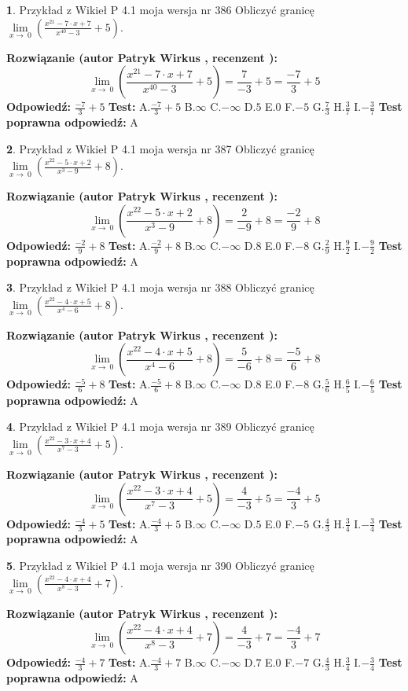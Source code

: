 \documentclass[12pt, a4paper]{article}
\theoremstyle{definition} %
\newtheorem{zad}{}
\newcommand{\zadStart}[1]{\begin{zad}#1\newline}
\newcommand{\zadStop}{\end{zad}}
\newcommand{\rozwStart}[2]{\noindent \textbf{Rozwiązanie (autor #1 , recenzent #2): }\newline}
\newcommand{\rozwStop}{\newline}
\newcommand{\odpStart}{\noindent \textbf{Odpowiedź:}\newline}
\newcommand{\odpStop}{\newline}
\newcommand{\testStart}{\noindent \textbf{Test:}\newline}
\newcommand{\testStop}{\newline}
\newcommand{\kluczStart}{\noindent \textbf{Test poprawna odpowiedź:}\newline}
\newcommand{\kluczStop}{\newline}
\begin{document}
\zadStart{Przykład z Wikieł P 4.1 moja wersja nr 386}
Obliczyć granicę $\lim\limits_{x\to\ 0}(\frac{x^{21}-7 \cdot x +7}{x^{40}-3}+5)$.
\zadStop
\rozwStart{Patryk Wirkus}{}
$$\lim\limits_{x\to\ 0}(\frac{x^{21}-7 \cdot x +7}{x^{40}-3}+5)=\frac{7}{-3}+5=\frac{-7}{3}+5$$
\rozwStop
\odpStart
$\frac{-7}{3}+5$
\odpStop
\testStart
A.$\frac{-7}{3}+5$
B.$\infty$
C.$-\infty$
D.$5$
E.$0$
F.$-5$
G.$\frac{7}{3}$
H.$\frac{3}{7}$
I.$-\frac{3}{7}$
\testStop
\kluczStart
A
\kluczStop



\zadStart{Przykład z Wikieł P 4.1 moja wersja nr 387}
Obliczyć granicę $\lim\limits_{x\to\ 0}(\frac{x^{22}-5 \cdot x +2}{x^{3}-9}+8)$.
\zadStop
\rozwStart{Patryk Wirkus}{}
$$\lim\limits_{x\to\ 0}(\frac{x^{22}-5 \cdot x +2}{x^{3}-9}+8)=\frac{2}{-9}+8=\frac{-2}{9}+8$$
\rozwStop
\odpStart
$\frac{-2}{9}+8$
\odpStop
\testStart
A.$\frac{-2}{9}+8$
B.$\infty$
C.$-\infty$
D.$8$
E.$0$
F.$-8$
G.$\frac{2}{9}$
H.$\frac{9}{2}$
I.$-\frac{9}{2}$
\testStop
\kluczStart
A
\kluczStop



\zadStart{Przykład z Wikieł P 4.1 moja wersja nr 388}
Obliczyć granicę $\lim\limits_{x\to\ 0}(\frac{x^{22}-4 \cdot x +5}{x^{4}-6}+8)$.
\zadStop
\rozwStart{Patryk Wirkus}{}
$$\lim\limits_{x\to\ 0}(\frac{x^{22}-4 \cdot x +5}{x^{4}-6}+8)=\frac{5}{-6}+8=\frac{-5}{6}+8$$
\rozwStop
\odpStart
$\frac{-5}{6}+8$
\odpStop
\testStart
A.$\frac{-5}{6}+8$
B.$\infty$
C.$-\infty$
D.$8$
E.$0$
F.$-8$
G.$\frac{5}{6}$
H.$\frac{6}{5}$
I.$-\frac{6}{5}$
\testStop
\kluczStart
A
\kluczStop



\zadStart{Przykład z Wikieł P 4.1 moja wersja nr 389}
Obliczyć granicę $\lim\limits_{x\to\ 0}(\frac{x^{22}-3 \cdot x +4}{x^{7}-3}+5)$.
\zadStop
\rozwStart{Patryk Wirkus}{}
$$\lim\limits_{x\to\ 0}(\frac{x^{22}-3 \cdot x +4}{x^{7}-3}+5)=\frac{4}{-3}+5=\frac{-4}{3}+5$$
\rozwStop
\odpStart
$\frac{-4}{3}+5$
\odpStop
\testStart
A.$\frac{-4}{3}+5$
B.$\infty$
C.$-\infty$
D.$5$
E.$0$
F.$-5$
G.$\frac{4}{3}$
H.$\frac{3}{4}$
I.$-\frac{3}{4}$
\testStop
\kluczStart
A
\kluczStop



\zadStart{Przykład z Wikieł P 4.1 moja wersja nr 390}
Obliczyć granicę $\lim\limits_{x\to\ 0}(\frac{x^{22}-4 \cdot x +4}{x^{8}-3}+7)$.
\zadStop
\rozwStart{Patryk Wirkus}{}
$$\lim\limits_{x\to\ 0}(\frac{x^{22}-4 \cdot x +4}{x^{8}-3}+7)=\frac{4}{-3}+7=\frac{-4}{3}+7$$
\rozwStop
\odpStart
$\frac{-4}{3}+7$
\odpStop
\testStart
A.$\frac{-4}{3}+7$
B.$\infty$
C.$-\infty$
D.$7$
E.$0$
F.$-7$
G.$\frac{4}{3}$
H.$\frac{3}{4}$
I.$-\frac{3}{4}$
\testStop
\kluczStart
A
\kluczStop
\end{document}
